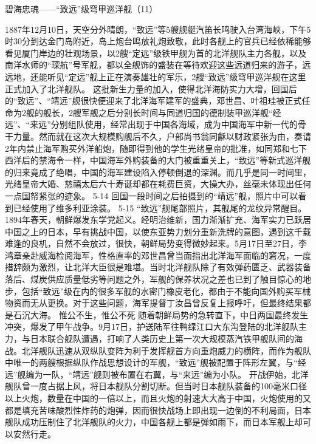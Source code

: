 \documentclass[12pt,UTF8]{ctexbook}
\begin{document}
碧海忠魂——“致远”级穹甲巡洋舰（11）

1887年12月10日，天空分外晴朗，“致远”等5艘舰艇汽笛长鸣驶入台湾海峡，下午5时30分到达金门岛附近，岛上炮台鸣放礼炮致敬，此时各舰上的官兵已经依稀能够看见厦门岸边的壮观场景，以2艘“定远”级铁甲舰为首的北洋舰队主力各舰，以及南洋水师的“琛航”号军舰，都以全舰饰的盛装在等待欢迎这些远道归来的游子，远远地，还能听见“定远”舰上正在演奏雄壮的军乐，2艘“致远”级穹甲巡洋舰在这里正式加入了北洋舰队。
这批新生力量的加入，使得北洋海防实力大增，回国后的“致远”、“靖远”舰很快便迎来了北洋海军建军的盛典，邓世昌、叶祖珪被正式任命为2舰的舰长，2艘军舰之后分别长时间与同道归国的德制装甲巡洋舰“经远”、“来远”分别组队使用，经常出现于中国各海域，成为中国海军中新一代的骨干力量。然而就在这次大规模购舰后不久，户部尚书翁同龢以财政紧张为由，奏请2年内禁止海军购买外洋船炮，随即得到他的学生光绪皇帝的批准，如同郑和七下西洋后的禁海令一样，中国海军外购装备的大门被重重关上，“致远”等新式巡洋舰的归来竟成了绝唱，中国的海军建设陷入停顿倒退的深渊。而几乎是同一时间里，光绪皇帝大婚、慈禧太后六十寿诞却都在耗费巨资，大操大办，丝毫未体现出任何一点国帑紧张的迹象。
5-14
回国一段时间之后拍摄到的“靖远”舰，照片中可以看到已经使用了维多利亚涂装。
5-15
“致远”舰尾部照片，其舰尾的龙纹异常醒目。
1894年春天，朝鲜爆发东学党起义。经明治维新，国力渐渐扩充、海军实力已跃居中国之上的日本，早有挑战中国，以使东亚势力划分重新洗牌的意图，遇到这千载难逢的良机，自然不会放过，很快，朝鲜局势变得微妙起来。5月17日至27日，李鸿章亲赴威海检阅海军，性格直率的邓世昌曾当面指出北洋海军面临的窘况，一度措辞颇为激烈，让北洋大臣很是难堪。当时北洋舰队除了有效弹药匮乏、武器装备落后、煤炭供应质量低劣等问题之外，军舰的保养状况之差也已到了触目惊心的地步，包括“致远”级在内的很多军舰的水密门橡皮老化，都由于不能向国外购买军械物资而无从更换。对于这些问题，海军提督丁汝昌曾反复上报呼吁，但最终结果都是石沉大海。
惟公不生，惟公不死
随着朝鲜局势的急转直下，中日两国最终发生冲突，爆发了甲午战争。9月17日，护送陆军往鸭绿江口大东沟登陆的北洋舰队主力，与日本联合舰队遭遇，打响了人类历史上第一次大规模蒸汽铁甲舰队间的海战。北洋舰队迅速从双纵队变阵为利于发挥舰首方向重炮威力的横阵，而作为舰队中唯一的两艘根据纵队作战思想设计的军舰，“致远”舰被配置于阵形左翼，与“经远”舰编为一队，“靖远”舰则被布置在右翼，与“来远”编为小队。
开战伊始，北洋舰队曾一度占据上风，将日本舰队分割切断。但当时日本舰队装备的100毫米口径以上火炮，数量在中国的一倍以上，而且火炮的射速大大高于中国，火炮使用的又都是填充苦味酸烈性炸药的炮弹，因而很快战场上即出现一边倒的不利局面，日本舰队成功压制住了北洋舰队的火力，中国各舰上都是弹如雨下，而日本军舰上却可以安然行走。
\end{document}
